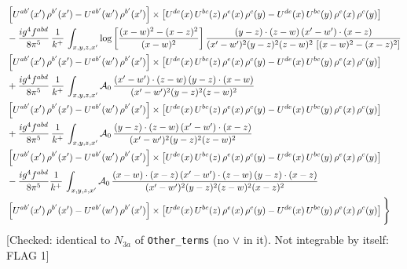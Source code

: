 \documentclass[9pt]{article}
\numberwithin{equation}{section}
\begin{document}
\begin{align}
& \left[U^{ab'}(x')\,\rho^{b'}(x')-U^{ab'}(w')\, \rho^{b'}(x')\right]\times \left[U^{de}(x)\,U^{bc}(z)\, \rho^{e}(x)\,\rho^{c}(y)-U^{de}(x)\,U^{bc}(y)\,\rho^{e}(x)\,\rho^{c}(y)\right] \notag \\
& -\frac{ig^{4}f^{abd}}{8\pi^{5}}\,\frac{1}{k^{+}}\,\int_{x,y,z,x'}\log{\left[\frac{(x-w)^{2}-(x-z)^{2}}{(x-w)^{2}}\right]}\,
\frac{(y-z)\cdot(z-w)\,(x'-w')\cdot(x-z)}{(x'-w')^{2}(y-z)^{2}(z-w)^{2}\,\left[(x-w)^{2}-(x-z)^{2}\right]}\notag \\ & \left[U^{ab'}(x')\,\rho^{b'}(x')-U^{ab'}(w')\, \rho^{b'}(x')\right]\times \left[U^{de}(x)\,U^{bc}(z)\, \rho^{e}(x)\,\rho^{c}(y)-U^{de}(x)\,U^{bc}(y)\,\rho^{e}(x)\,\rho^{c}(y)\right] \notag \\
& +\frac{ig^{4}f^{abd}}{8\pi^{5}}\,\frac{1}{k^{+}}\,\int_{x,y,z,x'}\mathcal{A}_{0}\,
\frac{(x'-w')\cdot(z-w)\,(y-z)\cdot(x-w)}{(x'-w')^{2}(y-z)^{2}(z-w)^{2}}\notag \\
& \left[U^{ab'}(x')\,\rho^{b'}(x')-U^{ab'}(w')\, \rho^{b'}(x')\right]\times \left[U^{de}(x)\,U^{bc}(z)\, \rho^{e}(x)\,\rho^{c}(y)-U^{de}(x)\,U^{bc}(y)\,\rho^{e}(x)\,\rho^{c}(y)\right] \notag \\
& +\frac{ig^{4}f^{abd}}{8\pi^{5}}\,\frac{1}{k^{+}}\,\int_{x,y,z,x'}\mathcal{A}_{0}\,
\frac{(y-z)\cdot(z-w)\,(x'-w')\cdot(x-z)}{(x'-w')^{2}(y-z)^{2}(z-w)^{2}}\notag \\ & \left[U^{ab'}(x')\,\rho^{b'}(x')-U^{ab'}(w')\, \rho^{b'}(x')\right]\times \left[U^{de}(x)\,U^{bc}(z)\, \rho^{e}(x)\,\rho^{c}(y)-U^{de}(x)\,U^{bc}(y)\,\rho^{e}(x)\,\rho^{c}(y)\right] \notag \\
& -\frac{ig^{4}f^{abd}}{8\pi^{5}}\frac{1}{k^{+}}\,\int_{x,y,z,x'}\mathcal{A}_{0}\,
\frac{(x-w)\cdot(x-z)\,(x'-w')\cdot(z-w)\,(y-z)\cdot(x-z)}{(x'-w')^{2}(y-z)^{2}(z-w)^{2}(x-z)^{2}}\notag \\ & \left[U^{ab'}(x')\,\rho^{b'}(x')-U^{ab'}(w')\, \rho^{b'}(x')\right]\times \left[U^{de}(x)\,U^{bc}(z)\, \rho^{e}(x)\,\rho^{c}(y)-U^{de}(x)\,U^{bc}(y)\,\rho^{e}(x)\,\rho^{c}(y)\right]\Bigg\}
\end{align} {\color{red}[Checked: identical to $N_{3a}$ of \texttt{Other\_terms} (no $\vee$ in it). Not integrable by itself: FLAG 1]}\par\noindent
\end{document}
